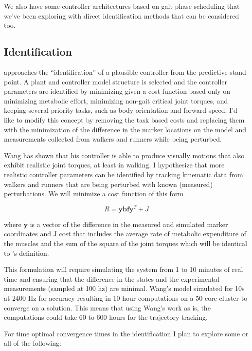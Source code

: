 \documentclass[11pt]{article}
\begin{document}
We also have some controller architectures based on gait phase scheduling that
we've been exploring with direct identification methods that can be considered
too.

\subsection*{Identification}

\cite{Wang2012} approaches the ``identification'' of a plausible controller
from the predictive stand point. A plant and controller model structure is
selected and the controller parameters are identified by minimizing given a
cost function based only on minimizing metabolic effort, minimizing non-gait
critical joint torques, and keeping several priority tasks, such as body
orientation and forward speed. I'd like to modify this concept by removing the
task based costs and replacing them with the minimization of the difference in
the marker locations on the model and measurements collected from walkers and
runners while being perturbed.

Wang has shown that his controller is able to produce visually motions that
also exhibit realistic joint torques, at least in walking. I hypothesize that
more realistic controller parameters can be identified by tracking kinematic
data from walkers and runners that are being perturbed with known (measured)
perturbations. We will minimize a cost function of this form

\begin{equation}
  R = \mathbf{y}\mathbf{bf}\mathbf{y}^T + J
\end{equation}

where $\mathbf{y}$ is a vector of the difference in the measured and simulated
marker coordinates and J cost that includes the average rate of metabolic
expenditure of the muscles and the sum of the square of the joint torques which
will be identical to \cite{Wang2012}'s definition.

This formulation will require simulating the system from 1 to 10 minutes of
real time and ensuring that the difference in the states and the experimental
measurements (sampled at 100 hz) are minimal. Wang's model simulated for 10s at
2400 Hz for accuracy resulting in 10 hour computations on a 50 core cluster to
converge on a solution. This means that using Wang's work as is, the
computations could take 60 to 600 hours for the trajectory tracking.

For time optimal convergence times in the identification I plan to explore some
or all of the following:
\end{document}
